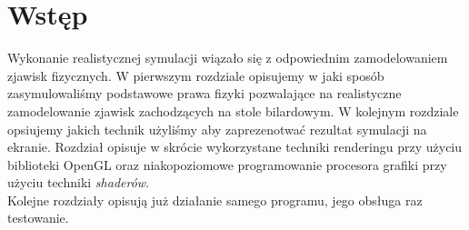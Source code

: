 \section{Wstęp}
Wykonanie realistycznej symulacji wiązało się z odpowiednim zamodelowaniem zjawisk fizycznych. W pierwszym rozdziale opisujemy w jaki sposób zasymulowaliśmy podstawowe prawa fizyki pozwalające na realistyczne zamodelowanie zjawisk zachodzących na stole bilardowym. W kolejnym rozdziale opsiujemy jakich technik użyliśmy aby zaprezenotwać rezultat symulacji na ekranie. Rozdział opisuje w skrócie wykorzystane techniki renderingu przy użyciu biblioteki OpenGL oraz niakopoziomowe programowanie procesora grafiki przy użyciu techniki \textit{shaderów}.\\
Kolejne rozdziały opisują już działanie samego programu, jego obsługa raz testowanie.
